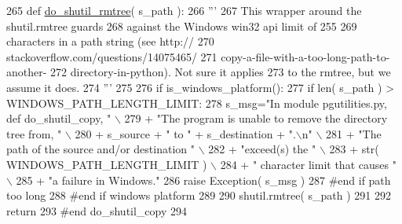 \begin{DoxyCode}
265 \textcolor{keyword}{def }\hyperlink{namespacenegui_1_1pgutilities_a75466ab2a233a7cb270ca769a37e5c66}{do\_shutil\_rmtree}( s\_path ):
266     \textcolor{stringliteral}{'''}
267 \textcolor{stringliteral}{    This wrapper around the shutil.rmtree guards}
268 \textcolor{stringliteral}{    against the Windows win32 api limit of 255}
269 \textcolor{stringliteral}{    characters in a path string (see http://}
270 \textcolor{stringliteral}{    stackoverflow.com/questions/14075465/}
271 \textcolor{stringliteral}{    copy-a-file-with-a-too-long-path-to-another-}
272 \textcolor{stringliteral}{    directory-in-python).  Not sure it applies}
273 \textcolor{stringliteral}{    to the rmtree, but we assume it does.}
274 \textcolor{stringliteral}{    '''}
275 
276     \textcolor{keywordflow}{if} is\_windows\_platform():
277         \textcolor{keywordflow}{if} len( s\_path ) > WINDOWS\_PATH\_LENGTH\_LIMIT:
278             s\_msg=\textcolor{stringliteral}{"In module pgutilities.py, def do\_shutil\_copy, "} \(\backslash\)
279                     + \textcolor{stringliteral}{"The program is unable to remove the directory tree from, "} \(\backslash\)
280                     + s\_source + \textcolor{stringliteral}{" to "} + s\_destination + \textcolor{stringliteral}{".\(\backslash\)n"} \(\backslash\)
281                     + \textcolor{stringliteral}{"The path of the source and/or destination "} \(\backslash\)
282                     + \textcolor{stringliteral}{"exceed(s) the "} \(\backslash\)
283                     + str( WINDOWS\_PATH\_LENGTH\_LIMIT )  \(\backslash\)
284                     + \textcolor{stringliteral}{" character limit that causes "} \(\backslash\)
285                     + \textcolor{stringliteral}{"a failure in Windows."}  
286             \textcolor{keywordflow}{raise} Exception( s\_msg )
287         \textcolor{comment}{#end if path too long}
288     \textcolor{comment}{#end if windows platform}
289 
290     shutil.rmtree( s\_path )
291 
292     \textcolor{keywordflow}{return}
293 \textcolor{comment}{#end do\_shutil\_copy}
294 
\end{DoxyCode}
